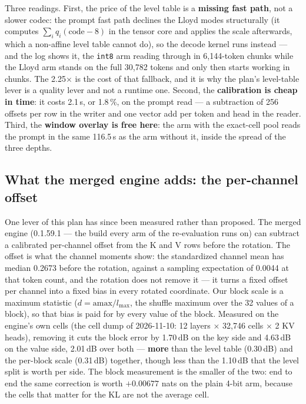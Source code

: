 \documentclass[10pt,twocolumn]{article}
\begin{document}
Three readings. First, the price of the level table is a \textbf{missing fast path}, not a slower codec: the prompt fast path declines the Lloyd modes structurally (it computes $\sum_i q_i(\text{code}-8)$ in the tensor core and applies the scale afterwards, which a non-affine level table cannot do), so the decode kernel runs instead --- and the log shows it, the \texttt{int8} arm reading through in 6,144-token chunks while the Lloyd arm stands on the full 30,782 tokens and only then starts working in chunks. The 2.25$\times$ is the cost of that fallback, and it is why the plan's level-table lever is a quality lever and not a runtime one. Second, the \textbf{calibration is cheap in time}: it costs 2.1\,s, or 1.8\,\%, on the prompt read --- a subtraction of 256 offsets per row in the writer and one vector add per token and head in the reader. Third, the \textbf{window overlay is free here}: the arm with the exact-cell pool reads the prompt in the same 116.5\,s as the arm without it, inside the spread of the three depths.

\subsection{What the merged engine adds: the per-channel offset}

One lever of this plan has since been measured rather than proposed. The merged engine (0.1.59.1 --- the build every arm of the re-evaluation runs on) can subtract a calibrated per-channel offset from the K and V rows before the rotation. The offset is what the channel moments show: the standardized channel mean has median 0.2673 before the rotation, against a sampling expectation of 0.0044 at that token count, and the rotation does not remove it --- it turns a fixed offset per channel into a fixed bias in every rotated coordinate. Our block scale is a maximum statistic ($d = \mathrm{amax}/l_{\max}$, the shuffle maximum over the 32 values of a block), so that bias is paid for by every value of the block. Measured on the engine's own cells (the cell dump of 2026-11-10: 12 layers $\times$ 32,746 cells $\times$ 2 KV heads), removing it cuts the block error by 1.70\,dB on the key side and 4.63\,dB on the value side, 2.01\,dB over both --- \textbf{more} than the level table (0.30\,dB) and the per-block scale (0.31\,dB) together, though less than the 1.10\,dB that the level split is worth per side. The block measurement is the smaller of the two: end to end the same correction is worth $+0.00677$ nats on the plain 4-bit arm, because the cells that matter for the KL are not the average cell.
\end{document}
